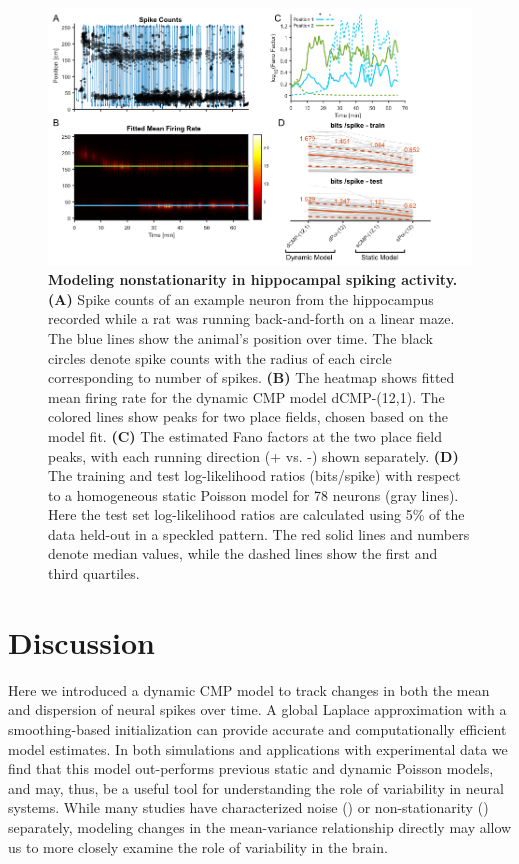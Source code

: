 \documentclass[]{article}
\begin{document}
	\begin{figure}[h!]
		\centering
		\includegraphics[width=1\textwidth]{figure5.png}
		\caption{\textbf{Modeling nonstationarity in hippocampal spiking activity. (A)} Spike counts of an example neuron from the hippocampus recorded while a rat was running back-and-forth on a linear maze. The blue lines show the animal’s position over time. The black circles denote spike counts with the radius of each circle corresponding to number of spikes. \textbf{(B)} The heatmap shows fitted mean firing rate for the dynamic CMP model dCMP-(12,1). The colored lines show peaks for two place fields, chosen based on the model fit. \textbf{(C)} The estimated Fano factors at the two place field peaks, with each running direction (+ vs. -) shown separately. \textbf{(D)} The training and test log-likelihood ratios (bits/spike) with respect to a homogeneous static Poisson model for 78 neurons (gray lines). Here the test set log-likelihood ratios are calculated using 5\% of the data held-out in a speckled pattern. The red solid lines and numbers denote median values, while the dashed lines show the first and third quartiles.}
		\label{fig5}
	\end{figure}
	
	\section{Discussion}
	Here we introduced a dynamic CMP model to track changes in both the mean and dispersion of neural spikes over time. A global Laplace approximation with a smoothing-based initialization can provide accurate and computationally efficient model estimates. In both simulations and applications with experimental data we find that this model out-performs previous static and dynamic Poisson models, and may, thus, be a useful tool for understanding the role of variability in neural systems. While many studies have characterized noise (\cite{DeWeese2003,Deweese2004,Taouali2016}) or non-stationarity (\cite{Tomko1974,Wu2008}) separately, modeling changes in the mean-variance relationship directly may allow us to more closely examine the role of variability in the brain. 
	
\end{document}
